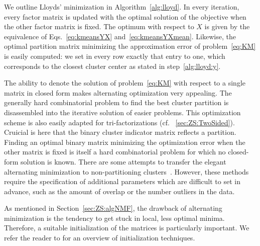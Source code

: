 We outline Lloyds' minimization in Algorithm~\ref{alg:lloyd}. In every iteration, every factor matrix is updated with the optimal solution of the objective when the other factor matrix is fixed. The optimum with respect to $X$ is given by the equivalence of Eqs.~\eqref{eq:kmeansYX} and~\eqref{eq:kmeansYXmean}. Likewise, the optimal partition matrix minimizing the approximation error of problem~\eqref{eq:KM} is easily computed: we set in every row exactly that entry to one, which corresponds to the closest cluster center as stated in step~\ref{alg:lloyd:y}.

The ability to denote the solution of problem~\eqref{eq:KM} with respect to a single matrix in closed form makes alternating optimization very appealing. The generally hard combinatorial problem to find the best cluster partition is disassembled into the iterative solution of easier problems. This optimization scheme is also easily adapted for tri-factorizations (cf. \@Section~\ref{sec:ZS:TwoSided}). Cruicial is here that the binary cluster indicator matrix reflects a partition. Finding an optimal binary matrix minimizing the optimization error when the other matrix is fixed is itself a hard combinatorial problem for which no closed-form solution is known.
There are some attempts to transfer the elegant alternating minimization to non-partitioning clusters~\citep{chawla2013kmeans,whang2018non}. However, these methods require the specification of additional parameters which are difficult to set in advance, such as the amount of overlap or the number outliers in the data.

As mentioned in Section~\ref{sec:ZS:algNMF}, the drawback of alternating minimization is the tendency to get stuck in local, less optimal minima. Therefore, a suitable initialization of the matrices is particularly important. We refer the reader to \cite{celebi2013comparative} for an overview of initialization techniques. 
